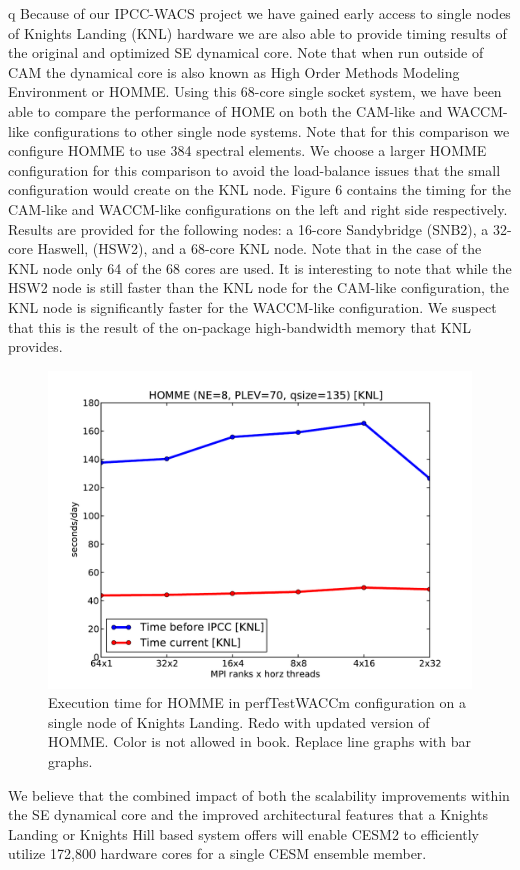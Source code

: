 q
Because of our IPCC-WACS project we have gained early access to single nodes of Knights Landing (KNL) hardware we are also able to provide timing results of the original and optimized SE dynamical core.  Note that when run outside of CAM the dynamical core is also known as High Order Methods Modeling Environment or HOMME.  Using this 68-core single socket system, we have been able to compare the performance of HOME on both the CAM-like and WACCM-like configurations to other single node systems.  Note that for this comparison we configure HOMME to use 384 spectral elements. We choose a larger HOMME configuration for this comparison to avoid the load-balance issues that the small configuration would create on the KNL node.  Figure 6 contains the timing for the CAM-like and WACCM-like configurations on the left and right side respectively. Results are provided for the following nodes:  a 16-core Sandybridge (SNB2), a 32-core Haswell, (HSW2), and a 68-core KNL node.  Note that in the case of the KNL node only 64 of the 68 cores are used.  It is interesting to note that while the HSW2 node is still faster than the KNL node for the CAM-like configuration, the KNL node is significantly faster for the WACCM-like configuration. We suspect that this is the result of the on-package high-bandwidth memory that KNL provides.

\begin{figure}[]
 \begin{center}
\includegraphics[width=12.0cm]{figures/homme-knl-waccm.pdf}
\end{center}
\caption{Execution time for HOMME in perfTestWACCm configuration on a single node of Knights Landing.{\color{red} Redo with updated version of HOMME.  Color is not allowed in book.  Replace line graphs with bar graphs.}}
\label{fig:homme-knl}
\end{figure}


We believe that the combined impact of both the scalability improvements within the SE dynamical core and the improved architectural features that a Knights Landing or Knights Hill based system offers will enable CESM2 to efficiently utilize 172,800 hardware cores for a single CESM ensemble member. 

